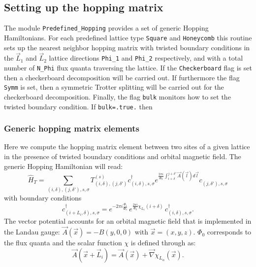%
\subsection{ Setting up the hopping matrix }

The module \texttt{Predefined\_Hopping}   provides a set of generic Hopping Hamiltonians.    For each  predefined lattice type 
\texttt{Square}  and \texttt{Honeycomb}   this routine sets  up the nearest  neighbor hopping matrix with twisted boundary conditions in the $\vec{L}_1$ and $\vec{L}_2$ lattice directions 
\texttt{Phi\_1}  and \texttt{Phi\_2}  respectively,  and with  a total number of \texttt{N\_Phi}  flux quanta traversing the lattice.    If the \texttt{Checkerboard}  flag is set then a checkerboard decomposition will be carried out.  If furthermore the flag \texttt{Symm} is set, then  a symmetric  Trotter  splitting  will be carried out  for the checkerboard   decomposition.    Finally,  the flag 
\texttt{bulk}  monitors how to set the twisted boundary condition.  If  \texttt{bulk=.true.}   then 

\subsubsection{Generic hopping matrix elements}\label{sec:generic_hopping}


Here we compute the hopping matrix element  between two sites of a given lattice  in the presence of twisted boundary conditions and  orbital magnetic field. 
The generic Hopping Hamiltonian will read: 
\begin{equation}
	   \hat{H}_T = \sum_{(i,\delta), (j,\delta'), s, \sigma}    T_{(i,\delta), (j,\delta')}^{(s)}    c^{\dagger}_{(i,\delta),s,\sigma }   e^{\frac{2 \pi i}{\Phi_0} \int_{i + \delta}^{j + \delta'}  \vec{A}(\vec{l})  d \vec{l}} c^{}_{(j,\delta'),s,\sigma }
\end{equation}
with boundary conditions 
\begin{equation}
	c^{\dagger}_{(i + L_i,\delta) ,s,\sigma }   =  e^{- 2 \pi i\frac{\Phi_i}{\Phi_0}} \, e^{\frac{2 \pi i }{\Phi_0} \chi_{L_1} ( i + \delta ) } \, c^{\dagger}_{(i,\delta) ,s,\sigma }.
\end{equation}
The vector potential accounts for an orbital magnetic field that is implemented  in the Landau  gauge:  $\vec{A}(\vec{x})  =  -B(y,0,0) $ with $ \vec{x} = (x,y,z)$. $\Phi_0$ corresponds to the flux  quanta and the scalar function $\chi$ is defined  through as:
\begin{equation}
	\vec{A}( \vec{x} + \vec{L}_{i} )  = \vec{A}( \vec{x} )   +  \vec{\nabla} \chi_{L_{\alpha}}(\vec{x}). 
\end{equation}

